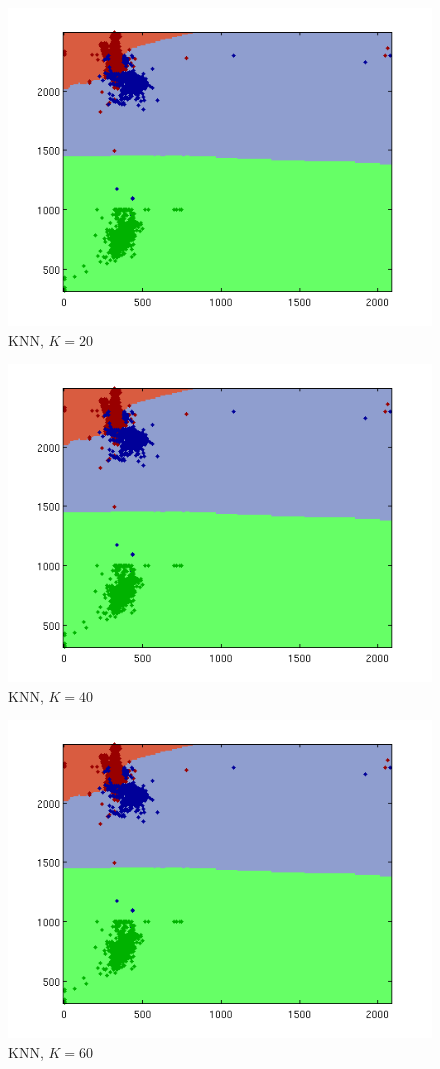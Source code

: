 \documentclass[a4paper]{article}
\begin{document}
\begin{figure}[htbp!]
\center
\includegraphics[clip, trim=40px 15px 30px 10px]{knn_real.png}
\caption{KNN, $K=20$}
\end{figure}

\begin{figure}[htbp!]
\center
\includegraphics[clip, trim=40px 15px 30px 10px]{knn_real.png}
\caption{KNN, $K=40$}
\end{figure}

\begin{figure}[htbp!]
\center
\includegraphics[clip, trim=40px 15px 30px 10px]{knn_real.png}
\caption{KNN, $K=60$}
\end{figure}
\end{document}
